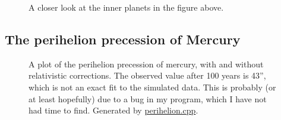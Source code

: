 \documentclass[12pt,english,a4paper]{article}
\newcommand{\program}[1]{\href{https://github.com/anjohan/Offentlig/blob/master/FYS3150/Oblig3/#1}{#1}}
\begin{document}
\begin{figure}[H]
\centering

\caption{A closer look at the inner planets in the figure above.}
\end{figure}

\subsection{The perihelion precession of Mercury}
\begin{figure}[H]
\centering

\caption{A plot of the perihelion precession of mercury, with and without relativistic corrections. The observed value after 100 years is 43'', which is not an exact fit to the simulated data. This is probably (or at least hopefully) due to a bug in my program, which I have not had time to find. Generated by \program{perihelion.cpp}.}
\end{figure}

\clearpage
{}
\printbibliography
\end{document}
